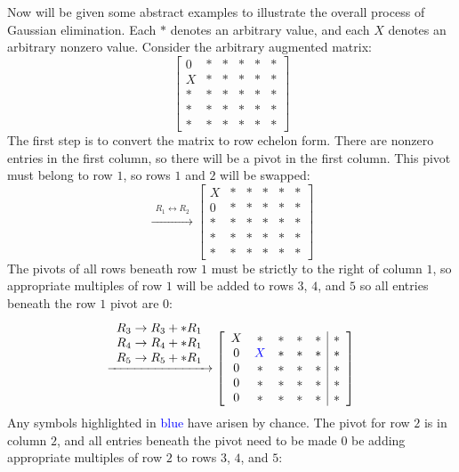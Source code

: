 \documentclass{article}
\newcommand{\blue}[1]{\textcolor{blue}{#1}}
\begin{document}
Now will be given some abstract examples to illustrate the overall process of Gaussian elimination. Each \(*\) denotes an arbitrary value, and each \(X\) denotes an arbitrary nonzero value. Consider the arbitrary augmented matrix:
\[\left[\begin{array}{ccccc|c}
0 & * & * & * & * & * \\
X & * & * & * & * & * \\
* & * & * & * & * & * \\
* & * & * & * & * & * \\
* & * & * & * & * & * 
\end{array}\right]\]
The first step is to convert the matrix to row echelon form. There are nonzero entries in the first column, so there will be a pivot in the first column. This pivot must belong to row \(1\), so rows \(1\) and \(2\) will be swapped:
\[\xrightarrow{\begin{array}{c} R_1 \leftrightarrow R_2 \end{array}} \left[\begin{array}{ccccc|c}
X & * & * & * & * & * \\
0 & * & * & * & * & * \\
* & * & * & * & * & * \\
* & * & * & * & * & * \\
* & * & * & * & * & * 
\end{array}\right]\]
The pivots of all rows beneath row \(1\) must be strictly to the right of column \(1\), so appropriate multiples of row \(1\) will be added to rows \(3\), \(4\), and \(5\) so all entries beneath the row \(1\) pivot are \(0\):
\[\xrightarrow{\begin{array}{c} R_3 \rightarrow R_3 + *R_1 \\ R_4 \rightarrow R_4 + *R_1 \\ R_5 \rightarrow R_5 + *R_1 \end{array}} \left[\begin{array}{ccccc|c}
X & * & * & * & * & * \\
0 & \blue{X} & * & * & * & * \\
0 & * & * & * & * & * \\
0 & * & * & * & * & * \\
0 & * & * & * & * & * 
\end{array}\right]\]
Any symbols highlighted in \blue{blue} have arisen by chance. The pivot for row \(2\) is in column \(2\), and all entries beneath the pivot need to be made \(0\) be adding appropriate multiples of row \(2\) to rows \(3\), \(4\), and \(5\):
\end{document}
